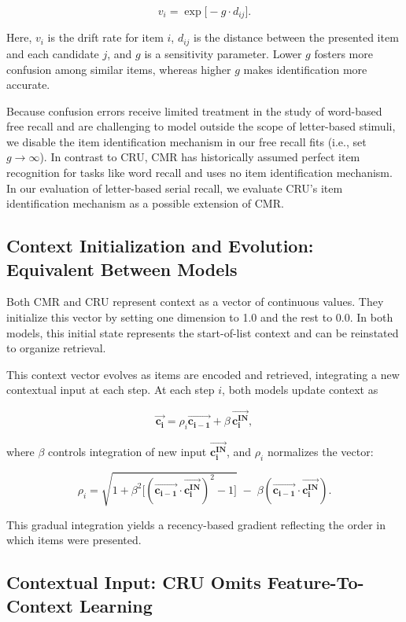 \documentclass[
  man,
  floatsintext,
  longtable,
  nolmodern,
  notxfonts,
  notimes,
  draftfirst,
  colorlinks=true,linkcolor=blue,citecolor=blue,urlcolor=blue]{apa7}
\begin{document}
\[
v_i = \exp \bigl[-g \cdot d_{ij}\bigr].
\]

Here, \(v_i\) is the drift rate for item \(i\), \(d_{ij}\) is the
distance between the presented item and each candidate \(j\), and \(g\)
is a sensitivity parameter. Lower \(g\) fosters more confusion among
similar items, whereas higher \(g\) makes identification more accurate.

Because confusion errors receive limited treatment in the study of
word-based free recall and are challenging to model outside the scope of
letter-based stimuli, we disable the item identification mechanism in
our free recall fits (i.e., set \(g \rightarrow \infty\)). In contrast
to CRU, CMR has historically assumed perfect item recognition for tasks
like word recall and uses no item identification mechanism. In our
evaluation of letter-based serial recall, we evaluate CRU's item
identification mechanism as a possible extension of CMR.

\subsection{Context Initialization and Evolution: Equivalent Between
Models}\label{context-initialization-and-evolution-equivalent-between-models}

Both CMR and CRU represent context as a vector of continuous values.
They initialize this vector by setting one dimension to 1.0 and the rest
to 0.0. In both models, this initial state represents the start-of-list
context and can be reinstated to organize retrieval.

This context vector evolves as items are encoded and retrieved,
integrating a new contextual input at each step. At each step \(i\),
both models update context as

\[
\mathbf{\vec{c_i}} = \rho_i \mathbf{\vec{c_{i-1}}} + \beta \, \mathbf{\vec{c_{i}^{\text{IN}}}},
\]

where \(\beta\) controls integration of new input
\(\mathbf{\vec{c_i^{IN}}}\), and \(\rho_i\) normalizes the vector:

\[
\rho_i = \sqrt{1 + \beta^2\bigl[(\mathbf{\vec{c_{i-1}}} \cdot \mathbf{\vec{c^{IN}_i}})^2 - 1\bigr]} \;-\;\beta(\mathbf{\vec{c_{i-1}}} \cdot \mathbf{\vec{c^{IN}_i}}).
\]

This gradual integration yields a recency-based gradient reflecting the
order in which items were presented.

\subsection{Contextual Input: CRU Omits Feature-To-Context
Learning}\label{contextual-input-cru-omits-feature-to-context-learning}
\end{document}

